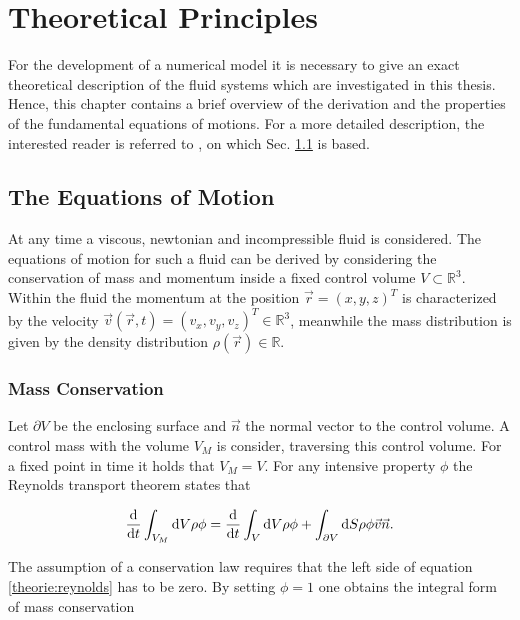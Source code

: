 \chapter{Theoretical Principles}

For the development of a numerical model it is necessary to give an exact theoretical description of the
fluid systems which are investigated in this thesis.
Hence, this chapter contains a brief overview of the derivation and the properties of the fundamental equations of motions.
For a more detailed description, the interested reader is referred to \citep{ferziger99}, on which Sec. \ref{theorie:eqm1} is based.

\section{The Equations of Motion}\label{theorie:eqm1}

At any time a viscous, newtonian and incompressible fluid is considered. The equations of motion for such a fluid can be derived by considering the conservation of
mass and momentum inside a fixed control volume $V \subset \mathbb{R}^3$.
Within the fluid the momentum at the position $\vec{r} = (x, y, z)^T$  is  characterized by the velocity $\vec{v}(\vec{r}, t) = (v_x, v_y, v_z)^T \in \mathbb{R}^3$,
meanwhile the mass distribution is given by the density distribution $\rho(\vec{r}) \in \mathbb{R}$.

\subsection{Mass Conservation}

Let $\partial V$ be the enclosing surface and $\vec{n}$ the normal vector to the control volume.
A control mass with the volume $V_M$ is consider, traversing this control volume. For a fixed point in time it holds that $V_M = V$.
For any intensive property $\phi$ the Reynolds transport theorem states that

\begin{align}
    \label{theorie:reynolds}
    \frac{\mathop{}\!\mathrm{d}}{\mathop{}\!\mathrm{d} t} \int_{V_M}\mathop{}\!\mathrm{d} V \rho \phi  = \frac{\mathop{}\!\mathrm{d}}{\mathop{}\!\mathrm{d} t}\int_{V} \mathop{}\!\mathrm{d} V \rho \phi + \int_{\partial V}\mathop{}\!\mathrm{d} S \rho \phi \vec{v} \vec{n}.
\end{align}

The assumption of a conservation law requires that the left side of equation \ref{theorie:reynolds} has to be zero.
By setting $\phi = 1$ one obtains the integral form of mass conservation

